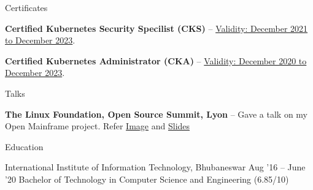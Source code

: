 \documentclass{resume} %
\begin{document}

\begin{rSection}{Certificates}
  \begin{rProjectSection}
    \item \textbf {Certified Kubernetes Security Specilist (CKS)} -- \href{https://www.credly.com/badges/05e37407-4ea5-4a88-b8c8-4e26235d7da1}{Validity: December 2021 to December 2023}.  
  \end{rProjectSection}
  \begin{rProjectSection}
    \item \textbf {Certified Kubernetes Administrator (CKA)} -- \href{https://www.credly.com/badges/e93b0ba2-51ea-41b3-82ba-10cf4d67ac70}{Validity: December 2020 to December 2023}.  
  \end{rProjectSection}
\end{rSection}


\begin{rSection}{Talks}
  \begin{rProjectSection}
    \item \textbf {The Linux Foundation, Open Source Summit, Lyon} -- Gave a talk on my Open Mainframe project. Refer \href{https://user-images.githubusercontent.com/24803604/68012174-99a5a680-fc89-11e9-8c8e-800e68b8c231.jpeg}{Image} and \href{https://drive.google.com/file/d/1z2dhNwudUs8BYJRzIXL70UH7htLJasf0/view}{Slides}
  \end{rProjectSection}
\end{rSection}


\begin{rSection}{Education}
  \begin{rEducationSection}{International Institute of Information Technology, Bhubaneswar}
                           {Aug '16 -- June '20}
                           {Bachelor of Technology in Computer Science and Engineering (6.85/10)}
  \end{rEducationSection}
\end{rSection}
\end{document}
